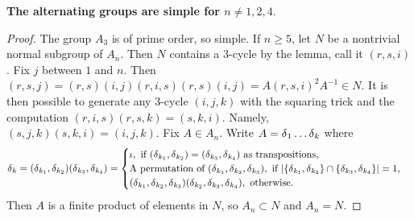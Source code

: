\noindent \textbf{The alternating groups are simple for $n \neq 1,2,4$}.
\begin{proof}
The group $A_3$ is of prime order, so simple. If $n \geq 5$, let $N$ be a nontrivial normal subgroup of $A_n$. Then $N$ contains a 3-cycle by the lemma, call it $(r,s,i)$. Fix $j$ between $1$ and $n$.
Then $(r,s,j) = (r,s)(i,j)(r,i,s)(r,s)(i,j) = A (r,s,i)^2 A^{-1} \in N$. It is then possible
to generate any 3-cycle
$(i,j,k)$ with the squaring trick and the computation $(r,i,s)(r,s,k) = (s,k,i)$. Namely,
$(s,j,k)(s,k,i) = (i,j,k)$. Fix $A \in A_n$. Write $A = \operatorname{\delta}_1 \hdots \operatorname{\delta}_{k}$ where $$
\operatorname{\delta}_k = (\operatorname{\delta}_{k_1},\operatorname{\delta}_{k_2})(\operatorname{\delta}_{k_3},\operatorname{\delta}_{k_4}) = \begin{cases}
\iota, \,\, \text{if } (\operatorname{\delta}_{k_1},\operatorname{\delta}_{k_2}) = (\operatorname{\delta}_{k_3},\operatorname{\delta}_{k_4}) \text{ as transpositions}, \\
\text{A permutation of } (\operatorname{\delta}_{k_1},\operatorname{\delta}_{k_2},\operatorname{\delta}_{k_3}), \text{ if $|\{\operatorname{\delta}_{k_1},\operatorname{\delta}_{k_2}\} \cap \{\operatorname{\delta}_{k_3},\operatorname{\delta}_{k_4}\}| = 1$}, \\
(\operatorname{\delta}_{k_1},\operatorname{\delta}_{k_2},\operatorname{\delta}_{k_3})(\operatorname{\delta}_{k_2},\operatorname{\delta}_{k_3},\operatorname{\delta}_{k_4}), \text{ otherwise.}
\end{cases}$$ Then $A$ is a finite product of elements in $N$, so $A_n \subset N$ and $A_n = N$.
\end{proof}
